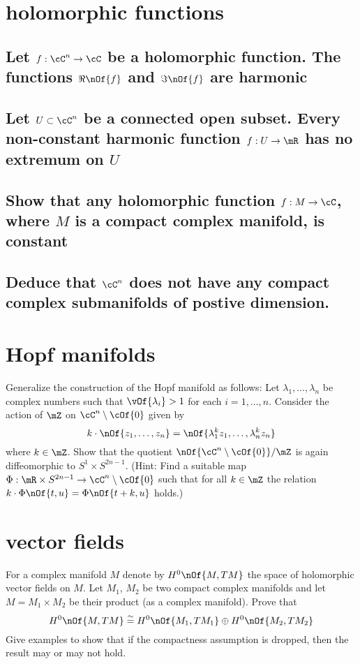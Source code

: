 \documentclass[11pt,a4paper]{scrartcl}
\begin{document}
	\section{holomorphic functions}

	\subsection{Let $f : \cC^n \to \cC$ be a holomorphic function.	The functions $\Re\nOf{f}$ and $\Im\nOf{f}$ are harmonic}

	\subsection{Let $U\subset \cC^n$ be a connected open subset. Every non-constant harmonic function $f : U \to \mR$ has no extremum on $U$}

	\subsection{Show that any holomorphic function $f:M \to \cC$, where $M$ is a compact complex manifold, is constant}

	\subsection{Deduce that $\cC^n$ does not have any compact complex submanifolds of postive dimension.}

	\section{Hopf manifolds}
	Generalize the construction of the Hopf manifold as follows: Let $\lambda_1,\dots,\lambda_n$ be complex numbers such that $\vOf{\lambda_i} > 1$ for each $i = 1, \dots, n$. Consider the action of $\mZ$ on $\cC^n\setminus\cOf{0}$ given by
	\begin{equation}
		k\cdot\nOf{z_1,\dots,z_n} = \nOf{\lambda_1^kz_1,\dots,\lambda_n^k z_n}
	\end{equation}
	where $k\in\mZ$. Show that the quotient $\nOf{\cC^n\setminus\cOf{0}}/\mZ$ is again diffeomorphic to $S^1\times S^{2n-1}$. (Hint: Find a suitable map $\Phi: \mR\times S^{2n-1}\to\cC^n\setminus\cOf{0}$ such that for all $k\in\mZ$ the relation $k\cdot\Phi\nOf{t,u} = \Phi\nOf{t+k,u}$ holds.)

	\section{vector fields}
	For a complex manifold $M$ denote by $H^0\nOf{M,TM}$ the space of holomorphic vector fields on $M$. Let $M_1$, $M_2$ be two compact complex manifolds and let $M = M_1\times M_2$ be their product (as a complex manifold). Prove that
	\begin{equation}
		H^0\nOf{M,TM} \stackrel{\sim}{=} H^0\nOf{M_1,TM_1} \oplus H^0\nOf{M_2,TM_2}
	\end{equation}
	Give examples to show that if the compactness assumption is dropped, then the result may or may not hold.
\end{document}

